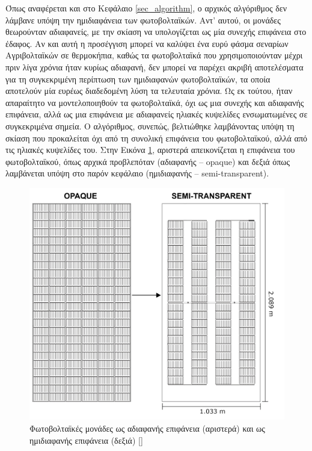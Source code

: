 \documentclass[12pt, a4paper]{report} %
\DeclareRobustCommand{\lcitep}[1]{%
  \english{[\cite{#1}]}%
}
\newcommand{\english}{\foreignlanguage{english}}
\begin{document}
Όπως αναφέρεται και στο Κεφάλαιο \ref{sec_algorithm}, ο αρχικός αλγόριθμος δεν λάμβανε υπόψη την ημιδιαφάνεια των φωτοβολταϊκών. 
Αντ' αυτού, οι μονάδες θεωρούνταν αδιαφανείς, με την σκίαση να υπολογίζεται ως μία συνεχής επιφάνεια στο έδαφος. Αν και αυτή η 
προσέγγιση μπορεί να καλύψει ένα ευρύ φάσμα σεναρίων Αγριβολταϊκών σε θερμοκήπια, καθώς τα φωτοβολταϊκά που χρησιμοποιούνταν μέχρι 
πριν λίγα χρόνια ήταν κυρίως αδιαφανή, δεν μπορεί να παρέχει ακριβή αποτελέσματα για τη συγκεκριμένη περίπτωση των ημιδιαφανών 
φωτοβολταϊκών, τα οποία αποτελούν μία ευρέως διαδεδομένη λύση τα τελευταία χρόνια. Ως εκ τούτου, ήταν απαραίτητο να μοντελοποιηθούν 
τα φωτοβολταϊκά, όχι ως μια συνεχής και αδιαφανής επιφάνεια, αλλά ως μια επιφάνεια με αδιαφανείς ηλιακές κυψελίδες ενσωματωμένες 
σε συγκεκριμένα σημεία. Ο αλγόριθμος, συνεπώς, βελτιώθηκε λαμβάνοντας υπόψη τη σκίαση που προκαλείται όχι από τη συνολική επιφάνεια 
του φωτοβολταϊκού, αλλά από τις ηλιακές κυψελίδες του. Στην Εικόνα \ref{fig_opaque_vs_semitr}, αριστερά απεικονίζεται η επιφάνεια 
του φωτοβολταϊκού, όπως αρχικά προβλεπόταν (αδιαφανής – \english{opaque}) και δεξιά όπως λαμβάνεται υπόψη στο παρόν κεφάλαιο 
(ημιδιαφανής – \english{semi-transparent}).

\begin{figure}[H]
    \centering
    \includegraphics[width=.8\linewidth]{OP_ST_PVS_updated.jpg}
    \caption{Φωτοβολταϊκές μονάδες ως αδιαφανής επιφάνεια (αριστερά) και ως ημιδιαφανής επιφάνεια (δεξιά) \lcitep{strawberries_bib17}}
    \label{fig_opaque_vs_semitr}
\end{figure}
\end{document}
